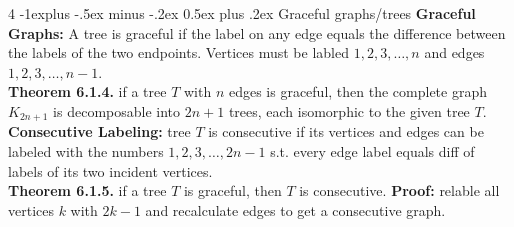 \documentclass[letterpaper, 8pt]{extarticle}
\makeatletter
\renewcommand{\section}{\@startsection{section}{1}{0mm}%
	{-1explus -.5ex minus -.2ex}%
	{0.5ex plus .2ex}%
	{\normalfont\normalsize\bfseries}}
\makeatother
\begin{document}
\begin{multicols*}{4}
	\section{Graceful graphs/trees}
	\textbf{Graceful Graphs:} A tree is graceful if the label on any edge equals the difference between the labels of the two endpoints. Vertices must be labled $1,2,3,\dots,n$ and edges $1,2,3,\dots,n-1$. \\
	\textbf{Theorem 6.1.4.} if a tree $T$ with $n$ edges is graceful, then the complete graph $K_{2n+1}$ is decomposable into $2n+1$ trees, each isomorphic to the given tree $T$. \\
	\textbf{Consecutive Labeling:} tree $T$ is consecutive if its vertices and edges can be labeled with the numbers $1,2,3,\dots, 2n-1$ s.t. every edge label equals diff of labels of its two incident vertices. \\
	\textbf{Theorem 6.1.5.} if a tree $T$ is graceful, then $T$ is consecutive. \textbf{Proof:} relable all vertices $k$ with $2k-1$ and recalculate edges to get a consecutive graph.


\end{multicols*}
\end{document}
